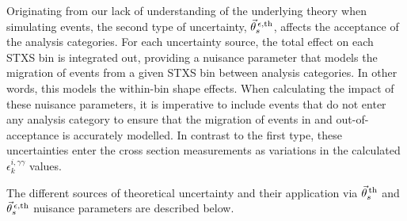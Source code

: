 Originating from our lack of understanding of the underlying theory when simulating events, the second type of uncertainty, $\vec{\theta}^{\,\epsilon,{\rm{th}}}_{s}$, affects the acceptance of the analysis categories. For each uncertainty source, the total effect on each STXS bin is integrated out, providing a nuisance parameter that models the migration of events from a given STXS bin between analysis categories. In other words, this models the within-bin shape effects. When calculating the impact of these nuisance parameters, it is imperative to include events that do not enter any analysis category to ensure that the migration of events in and out-of-acceptance is accurately modelled. In contrast to the first type, these uncertainties enter the cross section measurements as variations in the calculated $\epsilon^{i,\gamma\gamma}_{k}$ values.

The different sources of theoretical uncertainty and their application via $\vec{\theta}^{\,\rm{th}}_{s}$ and $\vec{\theta}^{\,\epsilon,{\rm{th}}}_{s}$ nuisance parameters are described below.

